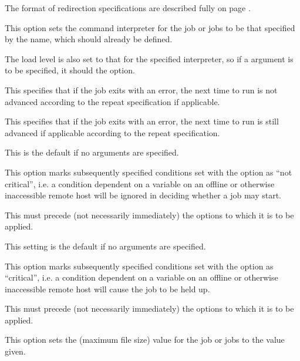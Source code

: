 The format of redirection specifications are described fully on page \pageref{btr:redirfmt}.


This option sets the command interpreter for the job or jobs to be that specified by the name,
which should already be defined.

The load level is also set to that for the specified interpreter, so if a
 argument is to be specified, it should  the  option.


This specifies that if the job exits with an error, the next time to run is not advanced according to the repeat specification if applicable.


This specifies that if the job exits with an error, the next time to run is still advanced if applicable according to the repeat specification.

This is the default if no arguments are specified.


This option marks subsequently specified conditions set with the  option as ``not critical'', i.e. a condition dependent on a variable on an offline or otherwise inaccessible remote host will be ignored in deciding whether a job may start.

This must precede (not necessarily immediately) the  options to which it is to be applied.

This setting is the default if no arguments are specified.


This option marks subsequently specified conditions set with the  option as ``critical'', i.e. a condition dependent on a
variable on an offline or otherwise inaccessible remote host will cause the job to be held up.

This must precede (not necessarily immediately) the  options to which it is to be applied.


This option sets the  (maximum file size) value for the job or jobs to the value given.

